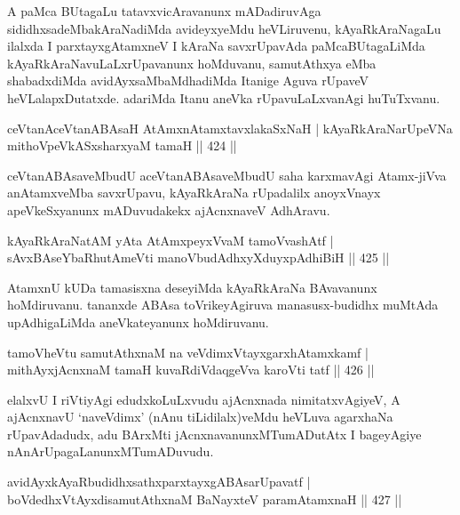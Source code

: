 \begin{artha}
A paMca BUtagaLu tatavxvicAravanunx mADadiruvAga sididhxsadeMbakAraNadiMda avideyxyeMdu heVLiruvenu, kAyaRkAraNagaLu ilalxda I parxtayxgAtamxneV I kAraNa savxrUpavAda paMcaBUtagaLiMda kAyaRkAraNavuLaLxrUpavanunx hoMduvanu, samutAthxya eMba shabadxdiMda avidAyxsaMbaMdhadiMda Itanige Aguva rUpaveV heVLalapxDutatxde. adariMda Itanu aneVka rUpavuLaLxvanAgi huTuTxvanu.
\end{artha}


\begin{shl}
ceVtanAceVtanABAsaH AtAmxnAtamxtavxlakaSxNaH |
kAyaRkAraNarUpeVNa mithoVpeVkASxsharxyaM tamaH \hfill || 424 ||
\end{shl}

\begin{artha}
ceVtanABAsaveMbudU aceVtanABAsaveMbudU saha karxmavAgi Atamx-jiVva anAtamxveMba savxrUpavu, kAyaRkAraNa rUpadalilx anoyxVnayx apeVkeSxyanunx mADuvudakekx ajAcnxnaveV AdhAravu.
\end{artha}

\begin{shl}
kAyaRkAraNatAM yAta AtAmx\s peyxVvaM tamoVvashAtf |
sAvxBAseYbaRhutAmeVti manoVbudAdhxyXduyxpAdhiBiH \hfill || 425 ||
\end{shl}

\begin{artha}
AtamxnU kUDa tamasisxna deseyiMda kAyaRkAraNa BAvavanunx
hoMdiruvanu. tananxde ABAsa toVrikeyAgiruva manasusx-budidhx muMtAda
upAdhigaLiMda aneVkateyanunx hoMdiruvanu.
\end{artha}

\begin{shl}
tamoVheVtu samutAthxnaM na veVdimxVtayxgarxhAtamxkamf |
mithAyxjAcnxnaM tamaH kuvaRdiVdaqgeVva karoVti tatf \hfill || 426 ||
\end{shl}

\begin{artha}
elalxvU I riVtiyAgi edudxkoLuLxvudu ajAcnxnada nimitatxvAgiyeV, A ajAcnxnavU `naveVdimx' (nAnu tiLidilalx)veMdu heVLuva agarxhaNa rUpavAdadudx, adu BArxMti jAcnxnavanunxMTumADutAtx I bageyAgiye nAnArUpagaLanunxMTu\-mADuvudu.
\end{artha}

\begin{shl}
avidAyxkAyaRbudidhxsathxparxtayxgABAsarUpavatf |
boVdedhxVtAyxdisamutAthxnaM BaNayxteV paramAtamxnaH \hfill || 427 ||
\end{shl}

